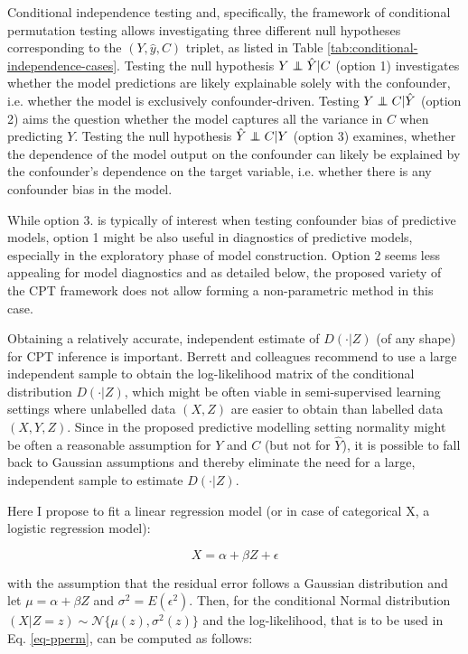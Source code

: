 \documentclass{article}
\theoremstyle{definition}
\newcommand\independent{\protect\mathpalette{\protect\independenT}{\perp}}
\def\independenT#1#2{\mathrel{\rlap{$#1#2$}\mkern2mu{#1#2}}}
\begin{document}
Conditional independence testing and, specifically, the framework of conditional permutation testing allows investigating three different null hypotheses corresponding to the $(Y, \hat{y}, C)$ triplet, as listed in Table \ref{tab:conditional-independence-cases}. Testing the null hypothesis $Y \independent \hat{Y} | C$ (option 1) investigates whether the model predictions are likely explainable solely with the confounder, i.e. whether the model is exclusively confounder-driven. Testing $Y \independent C | \hat{Y}$ (option 2) aims the question whether the model captures all the variance in $C$ when predicting $Y$. Testing the null hypothesis $\hat{Y} \independent C | Y$ (option 3) examines, whether the dependence of the model output on the confounder can likely be explained by the confounder's dependence on the target variable, i.e. whether there is any confounder bias in the model.

While option 3. is typically of interest when testing confounder bias of predictive models, option 1 might be also useful in diagnostics of predictive models, especially in the exploratory phase of model construction. Option 2 seems less appealing for model diagnostics and as detailed below, the proposed variety of the CPT framework does not allow forming a non-parametric method in this case.

Obtaining a relatively accurate, independent estimate of $D(\cdot|Z)$ (of any shape) for CPT inference is important. Berrett and colleagues recommend to use a large independent sample to obtain the log-likelihood matrix of the conditional distribution $D(\cdot|Z)$, which might be often viable in semi-supervised learning settings where unlabelled data $(X, Z)$ are easier to obtain than labelled data $(X, Y, Z)$.
Since in the proposed predictive modelling setting normality might be often a reasonable assumption for $Y$ and $C$ (but not for $\hat{Y}$), it is possible to fall back to Gaussian assumptions and thereby eliminate the need for a large, independent sample to estimate $D(\cdot|Z)$.

Here I propose to fit a linear regression model (or in case of categorical X, a logistic regression model):

\begin{equation}
    \label{eq:linreg}
    X = \alpha + \beta Z + \epsilon
\end{equation}


with the assumption that the residual error follows a Gaussian distribution and let $\mu = \alpha + \beta Z$ and $\sigma^2 = E(\epsilon^2)$. Then, for the conditional Normal distribution $ (X|Z=z) \sim \mathcal{N}\{\mu(z), \sigma^2(z)\}$ and the log-likelihood, that is to be used in Eq. \ref{eq-pperm}, can be computed as follows:
\end{document}
